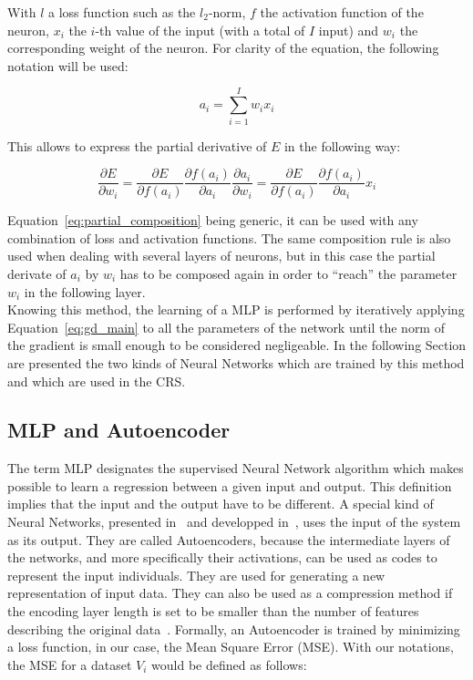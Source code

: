     With $l$ a loss function such as the $l_2$-norm, $f$ the activation function of the neuron, $x_i$ the $i$-th value of the input (with a total of $I$ input) and $w_i$ the corresponding weight of the neuron. For clarity of the equation, the following notation will be used:

    \begin{equation}
        a_i = \sum_{i=1}^I w_i x_i
        \label{eq:weighted_sum}
    \end{equation}

    This allows to express the partial derivative of $E$ in the following way:

    \begin{equation}
        \frac{\partial E}{\partial w_i} = \frac{\partial E}{\partial f\left( a_i\right)} \frac{\partial f(a_i)}{\partial a_i}\frac{\partial a_i}{\partial w_i} = \frac{\partial E}{\partial f\left( a_i\right)} \frac{\partial f(a_i)}{\partial a_i} x_i
        \label{eq:partial_composition}
    \end{equation}

    Equation~\ref{eq:partial_composition} being generic, it can be used with any combination of loss and activation functions. The same composition rule is also used when dealing with several layers of neurons, but in this case the partial derivate of $a_i$ by $w_i$ has to be composed again in order to ``reach'' the parameter $w_i$ in the following layer.\\

    Knowing this method, the learning of a MLP is performed by iteratively applying Equation~\ref{eq:gd_main} to all the parameters of the network until the norm of the gradient is small enough to be considered negligeable. In the following Section are presented the two kinds of Neural Networks which are trained by this method and which are used in the CRS.\@

    \subsection{MLP and Autoencoder}

    The term MLP designates the supervised Neural Network algorithm which makes possible to learn a regression between a given input and output. This definition implies that the input and the output have to be different. A special kind of Neural Networks, presented in~\cite{hinton2006reducing} and developped in~\cite{vincent2008extracting}, uses the input of the system as its output. They are called Autoencoders, because the intermediate layers of the networks, and more specifically their activations, can be used as codes to represent the input individuals. They are used for generating a new representation of input data. They can also be used as a compression method if the encoding layer length is set to be smaller than the number of features describing the original data~\cite{hinton2006reducing}. Formally, an Autoencoder is trained by minimizing a loss function, in our case, the Mean Square Error (MSE). With our notations, the MSE for a dataset $V_i$ would be defined as follows:
		
